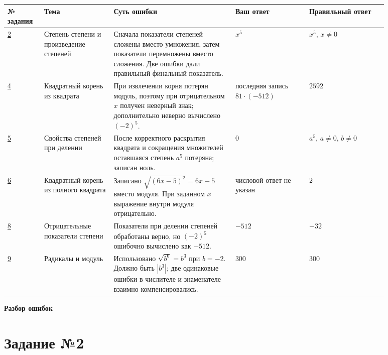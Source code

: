 \documentclass[12pt,a4paper]{article}
\begin{document}
\begin{tabular}{@{}
>{\raggedright\arraybackslash}p{0.08\linewidth}
>{\raggedright\arraybackslash}p{0.16\linewidth}
>{\raggedright\arraybackslash}p{0.29\linewidth}
>{\raggedright\arraybackslash}p{0.17\linewidth}
>{\raggedright\arraybackslash}p{0.18\linewidth}
@{}}
\toprule
№ задания & Тема & Суть ошибки & Ваш ответ & Правильный ответ \\
\midrule
\hyperref[task:2]{2} &
Степень степени и произведение степеней &
Сначала показатели степеней сложены вместо умножения, затем показатели перемножены вместо сложения. Две ошибки дали правильный финальный показатель. &
$x^5$ &
$x^5$, $x\ne0$ \\
\addlinespace
\hyperref[task:4]{4} &
Квадратный корень из квадрата &
При извлечении корня потерян модуль, поэтому при отрицательном $x$ получен неверный знак; дополнительно неверно вычислено $(-2)^5$. &
последняя запись $81\cdot(-512)$ &
$2592$ \\
\addlinespace
\hyperref[task:5]{5} &
Свойства степеней при делении &
После корректного раскрытия квадрата и сокращения множителей оставшаяся степень $a^5$ потеряна; записан ноль. &
$0$ &
$a^5$, $a\ne0$, $b\ne0$ \\
\addlinespace
\hyperref[task:6]{6} &
Квадратный корень из полного квадрата &
Записано $\sqrt{(6x-5)^2}=6x-5$ вместо модуля. При заданном $x$ выражение внутри модуля отрицательно. &
числовой ответ не указан &
$2$ \\
\addlinespace
\hyperref[task:8]{8} &
Отрицательные показатели степени &
Показатели при делении степеней обработаны верно, но $(-2)^5$ ошибочно вычислено как $-512$. &
$-512$ &
$-32$ \\
\addlinespace
\hyperref[task:9]{9} &
Радикалы и модуль &
Использовано $\sqrt{b^6}=b^3$ при $b=-2$. Должно быть $|b^3|$; две одинаковые ошибки в числителе и знаменателе взаимно компенсировались. &
$300$ &
$300$ \\
\bottomrule
\end{tabular}

\normalsize

\newpage
\null
\vfill
\begin{center}
{\LARGE\bfseries Разбор ошибок}
\end{center}
\vfill
\null

\newpage
{}
\label{task:2}
\section*{Задание №2}
\end{document}
